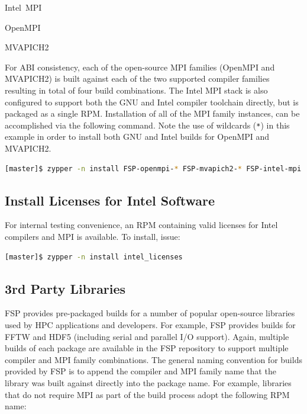 \documentclass[letterpaper]{article}
\begin{document}
{\begin{itemize*}
\item Intel~MPI
\item OpenMPI
\item MVAPICH2
\end{itemize*}
 For ABI consistency, each of the open-source MPI families (OpenMPI and
 MVAPICH2) is built against each of the two supported compiler families
 resulting in total of four build combinations.  The Intel MPI stack is also
 configured to support both the GNU and Intel compiler toolchain directly, but
 is packaged as a single RPM. Installation of all of the MPI family instances,
 can be accomplished via the following command. Note the use of wildcards
 (\texttt{*}) in this example in order to install both GNU and Intel builds for
 OpenMPI and MVAPICH2.

\begin{lstlisting}[language=bash]
[master]$ zypper -n install FSP-openmpi-* FSP-mvapich2-* FSP-intel-mpi
\end{lstlisting}

\subsection{Install Licenses for Intel Software}

For internal testing convenience, an RPM containing valid licenses for Intel
compilers and MPI is available. To install, issue:

\begin{lstlisting}[language=bash,keywords={},upquote=true]
[master]$ zypper -n install intel_licenses
\end{lstlisting}

\subsection{3rd Party Libraries}

FSP provides pre-packaged builds for a number of popular open-source libraries
used by HPC applications and developers. For example, FSP provides builds for
FFTW and HDF5 (including serial and parallel I/O support). Again, multiple
builds of each package are available in the FSP repository to support multiple
compiler and MPI family combinations. The general naming convention for builds
provided by FSP is to append the compiler and MPI family name that the library
was built against directly into the package name. For example, libraries that
do not require MPI as part of the build process adopt the following RPM
name: \\

}
\end{document}
